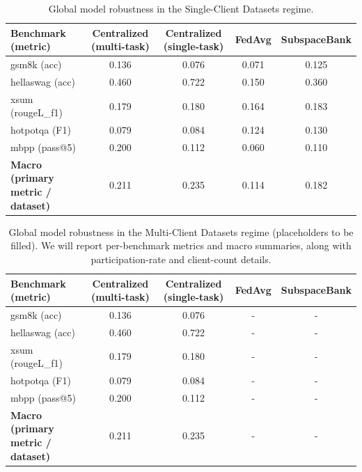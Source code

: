 \documentclass{article}
\theoremstyle{plain}
\theoremstyle{definition}
\theoremstyle{remark}
\begin{document}
\begin{table}[t]
  \caption{Global model robustness in the Single-Client Datasets regime.}
  \label{tab:global_nonsharded}
  \centering
  \begin{small}
  \begin{tabular}{lcccc}
    \toprule
    \textbf{Benchmark (metric)} & \textbf{Centralized (multi-task)} & \textbf{Centralized (single-task)} & \textbf{FedAvg} & \textbf{SubspaceBank} \\
    \midrule
    gsm8k (acc)          & 0.136 & 0.076 & 0.071 & 0.125 \\
    hellaswag (acc)      & 0.460 & 0.722 & 0.150 & 0.360 \\
    xsum (rougeL\_f1)     & 0.179 & 0.180 & 0.164 & 0.183 \\
    hotpotqa (F1)        & 0.079 & 0.084 & 0.124 & 0.130 \\
    mbpp (pass@5)        & 0.200 & 0.112 & 0.060 & 0.110 \\
    \midrule
    \textbf{Macro (primary metric / dataset)} & 0.211 & 0.235 & 0.114 & 0.182 \\
    \bottomrule
  \end{tabular}
  \end{small}
\end{table}


\begin{table}[t]
  \caption{Global model robustness in the Multi-Client Datasets regime (placeholders to be filled). We will report per-benchmark metrics and macro summaries, along with participation-rate and client-count details.}
  \label{tab:global_sharded_shell}
  \centering
  \begin{small}
  \begin{tabular}{lcccc}
    \toprule
    \textbf{Benchmark (metric)} & \textbf{Centralized (multi-task)} & \textbf{Centralized (single-task)} & \textbf{FedAvg} & \textbf{SubspaceBank} \\
    \midrule
    gsm8k (acc)          & 0.136 & 0.076 & - & -\\
    hellaswag (acc)      & 0.460 & 0.722 & -& -\\
    xsum (rougeL\_f1)     & 0.179 & 0.180 & -& -\\
    hotpotqa (F1)        & 0.079 & 0.084 & -& -\\
    mbpp (pass@5)        & 0.200 & 0.112 & -& -\\
    \midrule
    \textbf{Macro (primary metric / dataset)} & 0.211 & 0.235 & -& -\\
    \bottomrule
  \end{tabular}
  \end{small}
\end{table}
\end{document}

